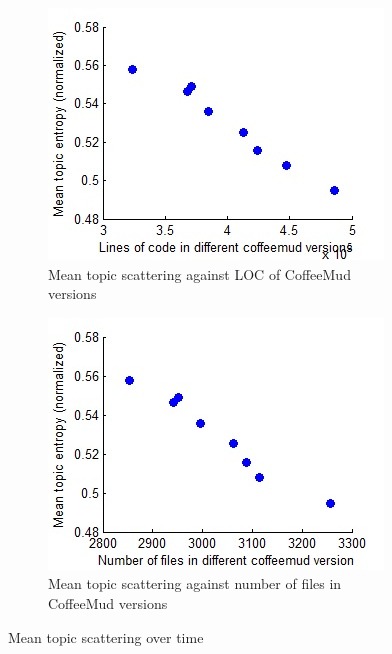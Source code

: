 \documentclass[12pt]{article}
\begin{document}
\begin{figure}
\begin{subfigure}[b]{0.5\textwidth}
                \label{scatter2}
        \end{subfigure}
        \begin{subfigure}[b]{0.5\textwidth}
                \centering
                \includegraphics[width=\textwidth]{mean-scattering-vs-loc-coffeemud.jpg}
                \caption{Mean topic scattering against LOC of CoffeeMud versions}
                \label{scatter3}
        \end{subfigure}%
        \begin{subfigure}[b]{0.5\textwidth}
                \centering
                \includegraphics[width=\textwidth]{mean-scattering-vs-num-files-coffeemud.jpg}
                \caption{Mean topic scattering against number of files in CoffeeMud versions}
                \label{scatter4}
        \end{subfigure}
        \caption{Mean topic scattering over time}\label{fig:scattering}
\end{figure}
\end{document}
